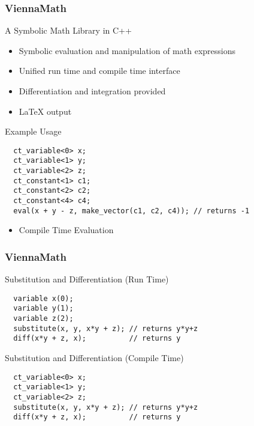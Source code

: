 \begin{frame}[fragile]
\frametitle{ViennaMath}

 \begin{block}{A Symbolic Math Library in C++}
   \begin{itemize}
    \item Symbolic evaluation and manipulation of math expressions
    \item Unified run time and compile time interface
    \item Differentiation and integration provided
    \item {\LaTeX} output
   \end{itemize}
 \end{block}

 \begin{block}{Example Usage}
\begin{lstlisting}
  ct_variable<0> x;
  ct_variable<1> y;
  ct_variable<2> z;
  ct_constant<1> c1;
  ct_constant<2> c2;
  ct_constant<4> c4;
  eval(x + y - z, make_vector(c1, c2, c4)); // returns -1
\end{lstlisting} 
   \begin{itemize}
    \item Compile Time Evaluation
   \end{itemize}
   \vspace*{-0.05cm}
 \end{block}
\end{frame}




\begin{frame}[fragile]
\frametitle{ViennaMath}

 \begin{block}{Substitution and Differentiation (Run Time)}
\begin{lstlisting}
  variable x(0);
  variable y(1);
  variable z(2);
  substitute(x, y, x*y + z); // returns y*y+z
  diff(x*y + z, x);          // returns y
\end{lstlisting} 
 \end{block}
 
 \begin{block}{Substitution and Differentiation (Compile Time)}
\begin{lstlisting}
  ct_variable<0> x;
  ct_variable<1> y;
  ct_variable<2> z;
  substitute(x, y, x*y + z); // returns y*y+z
  diff(x*y + z, x);          // returns y
\end{lstlisting} 
 \end{block}
 
\end{frame}

